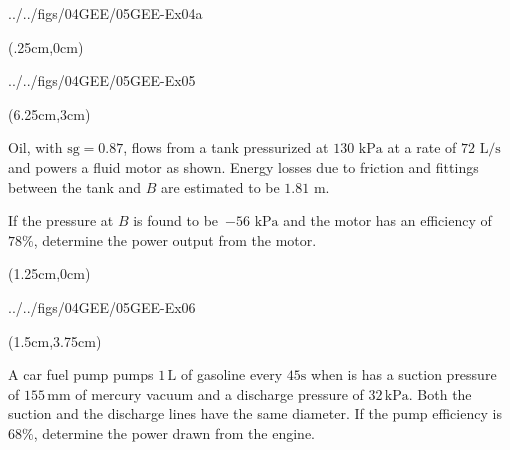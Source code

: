 \documentclass[9pt,xcolor={svgnames, x11names},professionalfonts, mathserif]{beamer}
\begin{document}
		\begin{frame}
			\begin{cfig}[0.35]{../../figs/04GEE/05GEE-Ex04a}\end{cfig}
		\end{frame}
		
		\begin{frame}
			\begin{textblock*}{0.5\textwidth}(.25cm,0cm)
				\begin{cfig}[0.35]{../../figs/04GEE/05GEE-Ex05}\end{cfig}
			\end{textblock*}
			\begin{textblock*}{0.55\textwidth}(6.25cm,3cm)
				\definecolor{example}{RGB}{196, 168, 136}
				\begin{myexer}[colframe=example, colbacktitle=example!80!white]{}{}
					\raggedright
					Oil, with $\text{sg}=0.87$, flows from a tank pressurized at $130\text{ kPa}$ at a rate of $72\text{ L/s}$ and
					powers a fluid motor as shown. Energy losses due to friction and fittings between the tank and $B$ are estimated to
					be $1.81\text{ m}$.
					\par\medskip
					If the pressure at $B$ is found to be~$-56\text{ kPa}$ and the motor has an efficiency of $78\%$,
					determine the power output from the motor.
				\end{myexer}
			\end{textblock*}
		\end{frame}
		
		\begin{frame}
			\begin{textblock*}{0.5\textwidth}(1.25cm,0cm)
				\begin{cfig}[0.45]{../../figs/04GEE/05GEE-Ex06}\end{cfig}
			\end{textblock*}
			\begin{textblock*}{0.6\textwidth}(1.5cm,3.75cm)
				\definecolor{example}{RGB}{175, 175, 175}
				\begin{myexam}[colframe=example, colbacktitle=example!80!white]{}{}
					\raggedright
					
					A car fuel pump pumps $1\,\text{L}$ of gasoline every $45\text{s}$ when is has a suction pressure of
					$155\,\text{mm}$ of mercury vacuum and a discharge pressure of $32\,\text{kPa}$. Both the suction and the discharge lines have the same diameter.
					\parb
					If the pump efficiency is $68\%$, determine the power drawn from the engine.
				\end{myexam}
			\end{textblock*}
		\end{frame}
		
\end{document}
